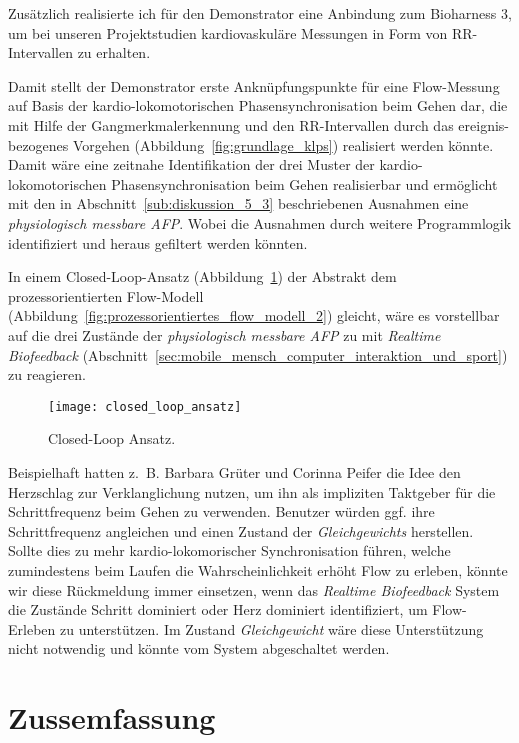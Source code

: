 Zusätzlich realisierte ich für den Demonstrator eine Anbindung zum Bioharness 3, um bei unseren Projektstudien \citep{Grueter2016a} kardiovaskuläre Messungen in Form von RR-Intervallen zu erhalten.

Damit stellt der Demonstrator erste Anknüpfungspunkte für eine Flow-Messung auf Basis der kardio-lokomotorischen Phasensynchronisation beim Gehen dar, die mit Hilfe der Gangmerkmalerkennung und den RR-Intervallen durch das ereignis-bezogenes Vorgehen (Abbildung~\ref{fig:grundlage_klps}) realisiert werden könnte. Damit wäre eine zeitnahe Identifikation der drei Muster der kardio-lokomotorischen Phasensynchronisation beim Gehen realisierbar und ermöglicht mit den in Abschnitt~\ref{sub:diskussion_5_3} beschriebenen Ausnahmen eine \emph{physiologisch messbare AFP}. Wobei die Ausnahmen durch weitere Programmlogik identifiziert und heraus gefiltert werden könnten. 

In einem Closed-Loop-Ansatz \citep[][S.~474]{Calvo2015} (Abbildung~\ref{fig:closed_loop_ansatz}) der Abstrakt dem prozessorientierten Flow-Modell (Abbildung~\ref{fig:prozessorientiertes_flow_modell_2}) gleicht, wäre es vorstellbar auf die drei Zustände der \emph{physiologisch messbare AFP} zu mit \emph{Realtime Biofeedback} (Abschnitt~\ref{sec:mobile_mensch_computer_interaktion_und_sport}) zu reagieren. 
\begin{figure}
	[!htb] \centering 
	\texttt{[image: closed\_loop\_ansatz]} \caption[Closed-Loop Ansatz.]{Closed-Loop Ansatz.} \label{fig:closed_loop_ansatz} 
\end{figure}

Beispielhaft hatten z.~B. Barbara Grüter und Corinna Peifer die Idee den Herzschlag zur Verklanglichung nutzen, um ihn als impliziten Taktgeber für die Schrittfrequenz beim Gehen zu verwenden. Benutzer würden ggf. ihre Schrittfrequenz angleichen und einen Zustand der \emph{Gleichgewichts} herstellen. Sollte dies zu mehr kardio-lokomorischer Synchronisation führen, welche zumindestens beim Laufen die Wahrscheinlichkeit erhöht Flow zu erleben, könnte wir diese Rückmeldung immer einsetzen, wenn das \emph{Realtime Biofeedback} System die Zustände {Schritt dominiert} oder {Herz dominiert} identifiziert, um Flow-Erleben zu unterstützen. Im Zustand \emph{Gleichgewicht} wäre diese Unterstützung nicht notwendig und könnte vom System abgeschaltet werden. 

\section{Zussemfassung} 

